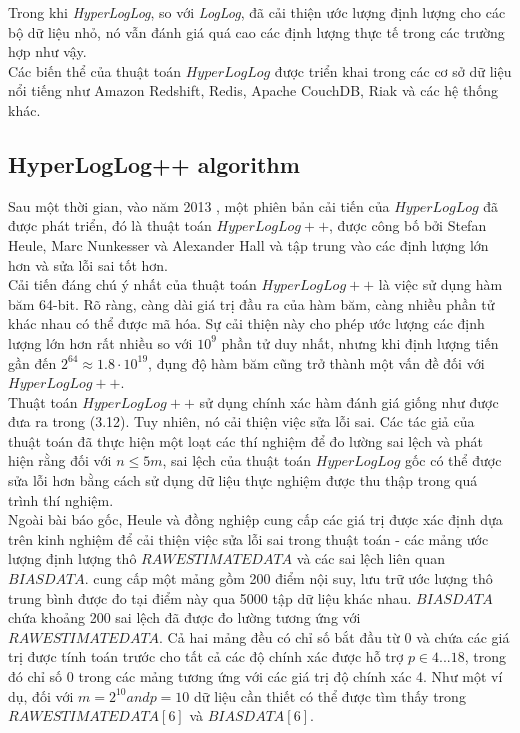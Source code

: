 \documentclass[letterpaper,13pt]{article}
\theoremstyle{mytheor}
\begin{document}
Trong khi \textit{HyperLogLog}, so với \textit{LogLog}, đã cải thiện ước lượng định lượng cho các bộ dữ liệu nhỏ, 
nó vẫn đánh giá quá cao các định lượng thực tế trong các trường hợp như vậy.\\
Các biến thể của thuật toán $HyperLogLog$ được triển khai trong các cơ sở dữ liệu nổi tiếng như Amazon Redshift, Redis, Apache CouchDB, Riak 
và các hệ thống khác.
\subsection{HyperLogLog++ algorithm}
Sau một thời gian, vào năm 2013 \cite{chabchoub2010sliding}, một phiên bản cải tiến của $HyperLogLog$ đã được phát triển, 
đó là thuật toán $HyperLogLog++$, được công bố bởi Stefan Heule, Marc Nunkesser và Alexander Hall và tập trung vào 
các định lượng lớn hơn và sửa lỗi sai tốt hơn.\\
\indent Cải tiến đáng chú ý nhất của thuật toán $HyperLogLog++$ là việc sử dụng hàm băm 64-bit. Rõ ràng, 
càng dài giá trị đầu ra của hàm băm, càng nhiều phần tử khác nhau có thể được mã hóa. Sự cải thiện này cho phép ước lượng 
các định lượng lớn hơn rất nhiều so với $10^9$ phần tử duy nhất, nhưng khi định lượng tiến gần đến $2^64 \approx 1.8\cdot 10^{19}$, 
đụng độ hàm băm cũng trở thành một vấn đề đối với $HyperLogLog++$.\\
\indent Thuật toán $HyperLogLog++$ sử dụng chính xác hàm đánh giá giống như được đưa ra trong (3.12). Tuy nhiên, nó cải thiện việc sửa lỗi sai. 
Các tác giả của thuật toán đã thực hiện một loạt các thí nghiệm để đo lường sai lệch và phát hiện rằng đối với $n \le 5m$, 
sai lệch của thuật toán $HyperLogLog$ gốc có thể được sửa lỗi hơn bằng cách sử dụng dữ liệu thực nghiệm được thu thập trong quá trình thí nghiệm.\\
\indent Ngoài bài báo gốc, Heule và đồng nghiệp cung cấp các giá trị được xác định dựa trên kinh nghiệm 
để cải thiện việc sửa lỗi sai trong thuật toán - các mảng ước lượng định lượng thô $RAWESTIMATEDATA$ và 
các sai lệch liên quan $BIASDATA$. cung cấp một mảng gồm 200 điểm nội suy, lưu trữ ước lượng thô trung bình được đo tại điểm này 
qua 5000 tập dữ liệu khác nhau. $BIASDATA$ chứa khoảng 200 sai lệch đã được đo lường tương ứng với $RAWESTIMATEDATA$. 
Cả hai mảng đều có chỉ số bắt đầu từ 0 và chứa các giá trị được tính toán trước cho tất cả các độ chính xác được hỗ trợ $p \in 4...18$,
trong đó chỉ số 0 trong các mảng tương ứng với các giá trị độ chính xác 4. Như một ví dụ, đối với $m = 2^{10} and p = 10$ 
dữ liệu cần thiết có thể được tìm thấy trong $RAWESTIMATEDATA[6]$ và $BIASDATA[6]$.\\
\end{document}
